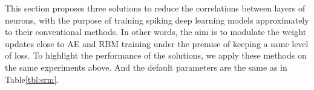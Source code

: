  
This section proposes three solutions to reduce the correlations between layers of neurons, with the purpose of training spiking deep learning models approximately to their conventional methods.
In other words, the aim is to modulate the weight updates close to AE and RBM training under the premise of keeping a same level of loss.
To highlight the performance of the solutions, we apply these methods on the same experiments above.
And the default parameters are the same as in Table\ref{tbl:srm}.
\begin{figure}
	\centering
	\begin{subfigure}[c]{0.45\textwidth}\raggedleft
		\\
		\\

\end{subfigure}
\end{figure}
